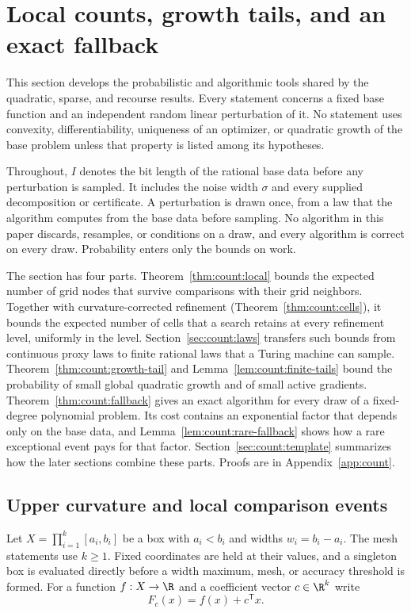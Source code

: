 \section{Local counts, growth tails, and an exact fallback}\label{sec:count}

This section develops the probabilistic and algorithmic tools shared by the
quadratic, sparse, and recourse results. Every statement concerns a fixed
base function and an independent random linear perturbation of it. No
statement uses convexity, differentiability, uniqueness of an optimizer, or
quadratic growth of the base problem unless that property is listed among
its hypotheses.

Throughout, $I$ denotes the bit length of the rational base data before any
perturbation is sampled. It includes the noise width $\sigma$ and every
supplied decomposition or certificate. A perturbation is drawn once, from a
law that the algorithm computes from the base data before sampling. No
algorithm in this paper discards, resamples, or conditions on a draw, and
every algorithm is correct on every draw. Probability enters only the bounds
on work.

The section has four parts. Theorem~\ref{thm:count:local} bounds the
expected number of grid nodes that survive comparisons with their grid
neighbors. Together with curvature-corrected refinement
(Theorem~\ref{thm:count:cells}), it bounds the expected number of cells that
a search retains at every refinement level, uniformly in the level.
Section~\ref{sec:count:laws} transfers such bounds from continuous proxy
laws to finite rational laws that a Turing machine can sample.
Theorem~\ref{thm:count:growth-tail} and Lemma~\ref{lem:count:finite-tails}
bound the probability of small global quadratic growth and of small active
gradients. Theorem~\ref{thm:count:fallback} gives an exact algorithm for
every draw of a fixed-degree polynomial problem. Its cost contains an
exponential factor that depends only on the base data, and
Lemma~\ref{lem:count:rare-fallback} shows how a rare exceptional event pays
for that factor. Section~\ref{sec:count:template} summarizes how the later
sections combine these parts. Proofs are in Appendix~\ref{app:count}.

\subsection{Upper curvature and local comparison events}\label{sec:count:local}

Let $X=\prod_{i=1}^k[a_i,b_i]$ be a box with $a_i<b_i$ and widths
$w_i=b_i-a_i$. The mesh statements use $k\ge1$. Fixed coordinates are
held at their values, and a singleton box is evaluated directly before a
width maximum, mesh, or accuracy threshold is formed.
For a function $f:X\to\R$ and a coefficient vector
$c\in\R^k$ write
\[
 F_c(x)=f(x)+c^{\mathsf T} x .
\]

